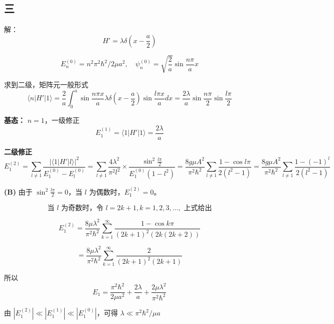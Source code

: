 \subsection{三}
解：\begin{equation}
H' = \lambda \delta \left( x - \frac{a}{2} \right)~
\end{equation}

\begin{equation}
E_n^{(0)} = n^2\pi^2 \hbar^2/2\mu a^2, \quad \psi_n^{(0)} = \sqrt{\frac{2}{a}} \sin \frac{n \pi}{a}x~
\end{equation}

求到二级，矩阵元一般形式
\begin{equation}
\langle n | H' | 1 \rangle = \frac{2}{a} \int_0^a \sin \frac{n \pi x}{a} \lambda \delta \left( x - \frac{a}{2} \right) \sin \frac{l\pi x}{a} dx = \frac{2\lambda}{a} \sin \frac{n \pi}{2} \sin \frac{l\pi}{2}~
\end{equation}

\textbf{基态：} $n=1$，一级修正
\begin{equation}
E_1^{(1)} = \langle 1 | H' | 1 \rangle = \frac{2\lambda}{a}~
\end{equation}

\textbf{二级修正}
\begin{equation}
E_1^{(2)} = \sum_{l \neq 1} \frac{|\langle 1 | H' | l \rangle |^2}{E_1^{(0)} - E_l^{(0)}} = \sum_{l \neq 1} \frac{4\lambda^2}{\pi^2 l^2} \times \frac{\sin^2 \frac{l \pi}{2}}{E_1^{(0)}(1 - l^2)} = \frac{8 g \mu A^2}{\pi^2 \hbar^2} \sum_{l \neq 1} \frac{1 - \cos l \pi}{2(l^2 - 1)}
= \frac{8 g \mu A^2}{\pi^2 \hbar^2} \sum_{l \neq 1} \frac{1 - (-1)^l}{2(l^2 - 1)}~
\end{equation}

\textbf{(B)} 由于 $\sin^2 \frac{l \pi}{2} = 0$，当 $l$ 为偶数时，$E_1^{(2)} = 0$。

\begin{equation}
\text{当 $l$ 为奇数时，令 $l=2k+1, k=1,2,3,\dots,$ 上式给出}~
\end{equation}

\begin{equation}
E_1^{(2)} = \frac{8 \mu \lambda^2}{\pi^2 \hbar^2} \sum_{k=1}^{\infty} \frac{1 - \cos k \pi}{(2k+1)^2(2k(2k+2))}~
\end{equation}

\begin{equation}
= \frac{8 \mu \lambda^2}{\pi^2 \hbar^2} \sum_{k=1}^{\infty} \frac{2}{(2k+1)^2(2k+1)}~
\end{equation}

所以
\begin{equation}
E_1 = \frac{\pi^2 \hbar^2}{2\mu a^2} + \frac{2\lambda}{a} + \frac{2 \mu \lambda^2}{\pi^2 \hbar^2}~
\end{equation}

由 $|E_1^{(2)}| \ll |E_1^{(1)}| \ll |E_1^{(0)}|$，可得 $\lambda \ll \pi^2 \hbar^2/\mu a$
